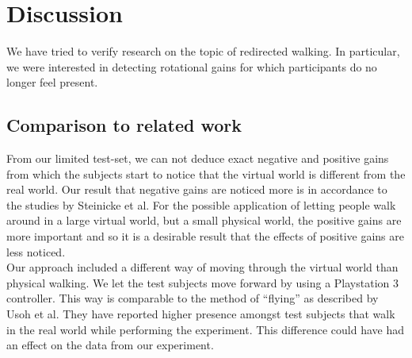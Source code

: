 \section{Discussion}
We have tried to verify research on the topic of redirected walking.
In particular, we were interested in detecting rotational gains for which participants do no longer feel present.

\subsection{Comparison to related work}
From our limited test-set, we can not deduce exact negative and positive gains from which the subjects start to notice that the virtual world is different from the real world.
Our result that negative gains are noticed more is in accordance to the studies by Steinicke et al. \cite{steinicke1}\cite{steinicke2}
For the possible application of letting people walk around in a large virtual world, but a small physical world, the positive gains are more important and so it is a desirable result that the effects of positive gains are less noticed.\\

Our approach included a different way of moving through the virtual world than physical walking.
We let the test subjects move forward by using a Playstation 3 controller.
This way is comparable to the method of ``flying'' as described by Usoh et al.\cite{usoh}
They have reported higher presence amongst test subjects that walk in the real world while performing the experiment.
This difference could have had an effect on the data from our experiment.